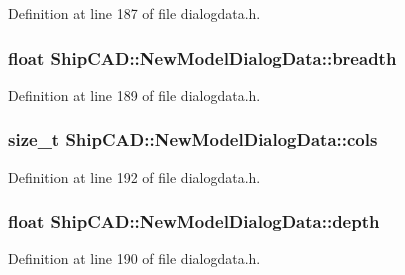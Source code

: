 Definition at line 187 of file dialogdata.\+h.

\subsubsection[{\texorpdfstring{breadth}{breadth}}]{\setlength{\rightskip}{0pt plus 5cm}float Ship\+C\+A\+D\+::\+New\+Model\+Dialog\+Data\+::breadth}\hypertarget{structShipCAD_1_1NewModelDialogData_af2d41edf92aa7fa317cc956801aeab50}{}\label{structShipCAD_1_1NewModelDialogData_af2d41edf92aa7fa317cc956801aeab50}


Definition at line 189 of file dialogdata.\+h.

\subsubsection[{\texorpdfstring{cols}{cols}}]{\setlength{\rightskip}{0pt plus 5cm}size\+\_\+t Ship\+C\+A\+D\+::\+New\+Model\+Dialog\+Data\+::cols}\hypertarget{structShipCAD_1_1NewModelDialogData_ad0fc3e908a10e878c747fac2fe71b67b}{}\label{structShipCAD_1_1NewModelDialogData_ad0fc3e908a10e878c747fac2fe71b67b}


Definition at line 192 of file dialogdata.\+h.

\subsubsection[{\texorpdfstring{depth}{depth}}]{\setlength{\rightskip}{0pt plus 5cm}float Ship\+C\+A\+D\+::\+New\+Model\+Dialog\+Data\+::depth}\hypertarget{structShipCAD_1_1NewModelDialogData_a6941e9fd4fd42257c0b05c6076aadc2a}{}\label{structShipCAD_1_1NewModelDialogData_a6941e9fd4fd42257c0b05c6076aadc2a}


Definition at line 190 of file dialogdata.\+h.

